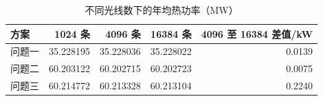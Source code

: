 \begin{table}[H]\centering\small
\caption{不同光线数下的年均热功率（MW）}\label{tab:convergence}
\begin{tabular}{lrrrr}\toprule
方案 & 1024 条 & 4096 条 & 16384 条 & 4096 至 16384 差值/kW\\\midrule
问题一 & 35.228195 & 35.228036 & 35.228022 & 0.0139\\
问题二 & 60.203122 & 60.202715 & 60.202723 & 0.0075\\
问题三 & 60.214772 & 60.213328 & 60.213104 & 0.2240\\
\bottomrule\end{tabular}
\end{table}
